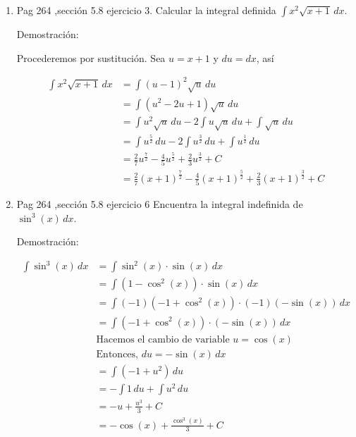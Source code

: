 \documentclass{report}
\begin{document}
\begin{enumerate}
        \item Pag 264 ,sección 5.8 ejercicio 3. Calcular la integral definida $\int x^{2} \sqrt{x+1} \,dx$.
        
        Demostración:
        
        Procederemos por sustitución. Sea $u = x + 1$ y $du = dx$, así
        
        \begin{align*}
            \int x^{2} \sqrt{x+1} \,dx &= \int (u-1)^2\sqrt{u} \,du \\
            &= \int (u^2 -2u +1)\sqrt{u} \,du\\
            &= \int u^2\sqrt{u} \,du - 2\int u\sqrt{u} \,du + \int \sqrt{u} \,du\\
            &= \int u^{\frac{5}{2}} \,du - 2\int u^{\frac{3}{2}} \,du + \int u^{\frac{1}{2}}\,du\\
            &= \frac{2}{7}u^{\frac{7}{2}} - \frac{4}{5}u^{\frac{5}{2}} + \frac{2}{3}u^\frac{3}{2} + C\\
            &= \frac{2}{7}(x+1)^{\frac{7}{2}} - \frac{4}{5}(x+1)^{\frac{5}{2}} + \frac{2}{3}(x+1)^\frac{3}{2} + C
        \end{align*}
        
        \item Pag 264 ,sección 5.8 ejercicio 6 Encuentra la integral indefinida de $\sin^3(x) \, dx$.
        
        Demostración:
        
        \[
        \begin{align*}
        \int \sin^3(x) \, dx &= \int \sin^2(x) \cdot \sin(x) \, dx \\
        &= \int (1 - \cos^2(x)) \cdot \sin(x) \, dx \\
        &= \int (-1)(-1 + \cos^2(x)) \cdot (-1)(-\sin(x)) \, dx \\
        &= \int (-1 + \cos^2(x)) \cdot (-\sin(x)) \, dx \\
        & \text{Hacemos el cambio de variable } u = \cos(x) \\
        & \text{Entonces, } du = -\sin(x) \, dx \\
        &= \int (-1 + u^2) \, du \\
        &= -\int 1 \, du + \int u^2 \, du \\
        &= -u + \frac{u^3}{3} + C \\
        &= -\cos(x) + \frac{\cos^3(x)}{3} + C
        \end{align*}
        \]
        

\end{enumerate}
\end{document}
